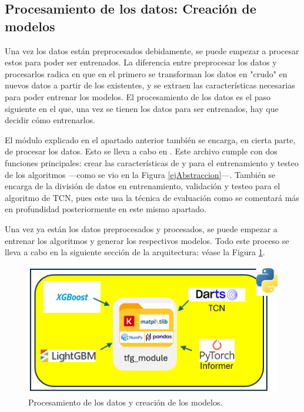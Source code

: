 \subsection{Procesamiento de los datos: Creación de modelos}
Una vez los datos están preprocesados debidamente, se puede empezar a procesar estos para poder ser entrenados. La diferencia entre preprocesar los datos y procesarlos radica en que en el primero se transforman los datos en "crudo" en nuevos datos a partir de los existentes, y se extraen las características necesarias para poder entrenar los modelos. El procesamiento de los datos es el paso siguiente en el que,  una vez se tienen los datos para ser entrenados, hay que decidir cómo entrenarlos.

El módulo explicado en el apartado anterior también se encarga, en cierta parte, de procesar los datos. Esto se lleva a cabo en . Este archivo cumple con dos funciones principales: crear las características de  y  para el entrenamiento y testeo de  los algoritmos ---como se vio en la Figura \ref{ejAbstraccion}---. También se encarga de la división de datos en entrenamiento, validación y testeo para el algoritmo de TCN, pues este usa la técnica de evaluación  como se comentará más en profundidad posteriormente en este mismo apartado.

Una vez ya están los datos preprocesados y procesados, se puede empezar a entrenar los algoritmos y generar los respectivos modelos. Todo este proceso se lleva a cabo en la siguiente sección de la arquitectura: véase la Figura \ref{procesamiento}.

\begin{figure}[H]
    \centering
    \includegraphics[scale = 0.84]{imgs/procesamiento_datos.png}
    \caption{Procesamiento de los datos y creación de los modelos.}
    \label{procesamiento}
\end{figure}

